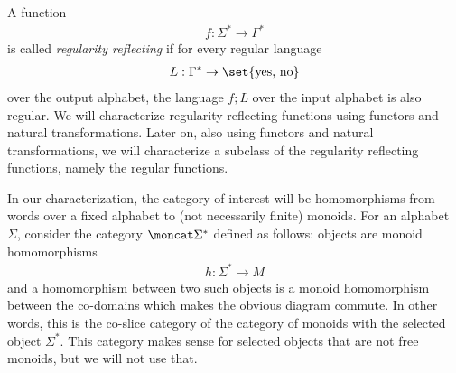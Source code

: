 
A function 
\begin{align*}
f : \Sigma^* \to \Gamma^*
\end{align*}
is called \emph{regularity reflecting} if for every regular language 
\begin{align*}
    L : \Gamma^* \to \set{\text{yes, no}}
    \end{align*}
over the output alphabet, the language $f;L$ over the input alphabet is also regular. We will characterize regularity reflecting functions using functors and natural transformations. Later on, also using functors and natural transformations, we will characterize a subclass of the regularity reflecting functions, namely the regular functions.

In our characterization, the category of interest will be homomorphisms from words over a fixed alphabet to (not necessarily finite) monoids.
For an alphabet $\Sigma$, consider the category $\moncat \Sigma^*$ defined as follows: objects are monoid homomorphisms 
\begin{align*}
h : \Sigma^* \to M
\end{align*}
and a homomorphism between two such objects is a monoid homomorphism between the co-domains  which makes the obvious diagram commute. In other words, this is the co-slice category of the category of monoids with the selected object $\Sigma^*$. This category makes sense for selected objects that are not free monoids, but we will not use that. 


